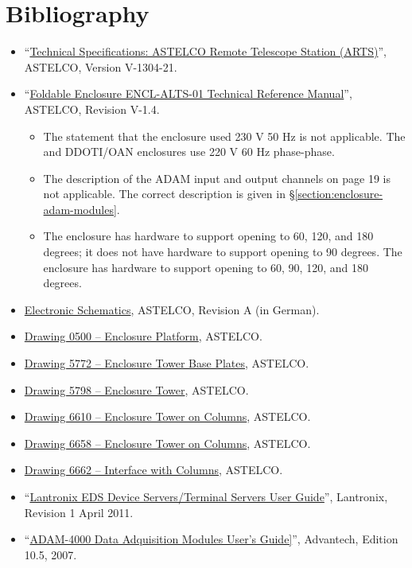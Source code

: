 \section{Bibliography}

\begin{flushleft}
\begin{itemize}
\item “\href{bibliography/astelco-enclosure-data-sheet.pdf}{Technical Specifications: ASTELCO Remote Telescope Station (ARTS)}”, ASTELCO, Version V-1304-21.
\item “\href{bibliography/astelco-enclosure-technical-reference-manual.pdf}{Foldable Enclosure ENCL-ALTS-01 Technical Reference Manual}”, ASTELCO, Revision V-1.4.
\begin{itemize}
\item The statement that the enclosure used 230 V 50 Hz is not applicable. The {\projectname} and DDOTI/OAN enclosures use 220 V 60 Hz phase-phase.
\item The description of the ADAM input and output channels on page 19 is not applicable. The correct description is given in \S\ref{section:enclosure-adam-modules}.
\item 
\ifcoatlioan
The {\projectname} enclosure has hardware to support opening to 60, 120, and 180 degrees; it does not have hardware to support opening to 90 degrees. 
\fi
\ifddotioan
The {\projectname} enclosure has hardware to support opening to 60, 90, 120, and 180 degrees.
\fi
\end{itemize}
\item \href{bibliography/astelco-enclosure-electronics-schematics.pdf}{Electronic Schematics}, ASTELCO, Revision A (in German).
\item \href{bibliography/astelco-enclosure-drawing-0500.pdf}{Drawing 0500 -- Enclosure Platform}, ASTELCO.
\item \href{bibliography/astelco-enclosure-drawing-5772.pdf}{Drawing 5772 -- Enclosure Tower Base Plates}, ASTELCO.
\item \href{bibliography/astelco-enclosure-drawing-5798.pdf}{Drawing 5798 -- Enclosure Tower}, ASTELCO.
\item \href{bibliography/astelco-enclosure-drawing-6610.pdf}{Drawing 6610 -- Enclosure Tower on Columns}, ASTELCO.
\item \href{bibliography/astelco-enclosure-drawing-6658.pdf}{Drawing 6658 -- Enclosure Tower on Columns}, ASTELCO.
\item \href{bibliography/astelco-enclosure-drawing-6662.pdf}{Drawing 6662 -- Interface with Columns}, ASTELCO.
\item “\href{bibliography/lantronix-eds-user-guide.pdf}{Lantronix EDS Device Servers/Terminal Servers User Guide}”, Lantronix, Revision 1 April 2011.
\item “\href{bibliography/advantech-adam-4000.pdf}{ADAM-4000 Data Adquisition Modules User's Guide]}”, Advantech, Edition 10.5, 2007.
\end{itemize}
\end{flushleft}